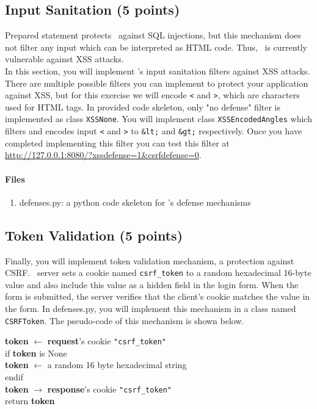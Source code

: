 \documentclass[letterpaper,12pt]{report}
\begin{document}
\subsection{Input Sanitation (5 points)}
\label{sec:filter_tutorial}
Prepared statement protects \bungle\ against SQL injections, but this mechanism does not filter any input which can be interpreted as HTML code. Thus, \bungle\ is currently vulnerable against XSS attacks.\\
In this section, you will implement \bungle's input sanitation filters against XSS attacks. There are multiple possible filters you can implement to protect your application against XSS, but for this exercise we will encode \texttt{<} and \texttt{>}, which are characters used for HTML tags. In provided code skeleton, only "no defense" filter is implemented as class \texttt{XSSNone}. You will implement class \texttt{XSSEncodedAngles} which filters and encodes input \texttt{<} and \texttt{>} to \texttt{\&lt;} and \texttt{\&gt;} respectively. Once you have completed implementing this filter you can test this filter at \url{http://127.0.0.1:8080/?xssdefense=1&csrfdefense=0}.\\

\paragraph{Files}
\begin{enumerate}
\item defenses.py: a python code skeleton for \bungle's defense mechanisms\\
\end{enumerate}

\subsection{Token Validation (5 points)}
\label{sec:tokval_tutorial}
Finally, you will implement token validation mechanism, a protection against CSRF. \bungle\ server sets a cookie named \texttt{csrf\_token} to a random hexadecimal 16-byte value and also include this value as a hidden field in the login form.  When the form is submitted, the server verifies that the client's cookie matches the value in the form. In defenses.py, you will implement this mechanism in a class named \texttt{CSRFToken}. The pseudo-code of this mechanism is shown below.

\begin{mdframed}
\textbf{token} $\leftarrow$ \textbf{request}'s cookie \texttt{"csrf\_token"}\\
if \textbf{token} is None\\
\hspace*{0.5cm} \textbf{token} $\leftarrow$ a random 16 byte hexadecimal string\\
endif\\
\textbf{token} $\rightarrow$ \textbf{response}'s cookie \texttt{"csrf\_token"}\\
return \textbf{token}
\end{mdframed}
\end{document}
